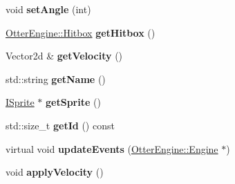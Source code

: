 \begin{DoxyCompactItemize}
\item 
void {\bfseries set\+Angle} (int)\hypertarget{class_otter_engine_1_1_object_aa3c4b0b2bcdf9462f841e9d3a58402be}{}\label{class_otter_engine_1_1_object_aa3c4b0b2bcdf9462f841e9d3a58402be}

\item 
\hyperlink{class_otter_engine_1_1_hitbox}{Otter\+Engine\+::\+Hitbox} {\bfseries get\+Hitbox} ()\hypertarget{class_otter_engine_1_1_object_acd5e30ca045b7c9972ecfd572572de64}{}\label{class_otter_engine_1_1_object_acd5e30ca045b7c9972ecfd572572de64}

\item 
Vector2d \& {\bfseries get\+Velocity} ()\hypertarget{class_otter_engine_1_1_object_a6f25a324e04e93fb0747d8c2f6e20097}{}\label{class_otter_engine_1_1_object_a6f25a324e04e93fb0747d8c2f6e20097}

\item 
std\+::string {\bfseries get\+Name} ()\hypertarget{class_otter_engine_1_1_object_a654aa1b2f6d84c9b1f9e123001be318e}{}\label{class_otter_engine_1_1_object_a654aa1b2f6d84c9b1f9e123001be318e}

\item 
\hyperlink{class_otter_engine_1_1_i_sprite}{I\+Sprite} $\ast$ {\bfseries get\+Sprite} ()\hypertarget{class_otter_engine_1_1_object_a8a87efe855c28b057e584abe912f59aa}{}\label{class_otter_engine_1_1_object_a8a87efe855c28b057e584abe912f59aa}

\item 
std\+::size\+\_\+t {\bfseries get\+Id} () const \hypertarget{class_otter_engine_1_1_object_a8156c4c18c7234fa7d2a6ee11b14f7d7}{}\label{class_otter_engine_1_1_object_a8156c4c18c7234fa7d2a6ee11b14f7d7}

\item 
virtual void {\bfseries update\+Events} (\hyperlink{class_otter_engine_1_1_engine}{Otter\+Engine\+::\+Engine} $\ast$)\hypertarget{class_otter_engine_1_1_object_a5b5b89450cfbabbdd4614602dc294afb}{}\label{class_otter_engine_1_1_object_a5b5b89450cfbabbdd4614602dc294afb}

\item 
void {\bfseries apply\+Velocity} ()\hypertarget{class_otter_engine_1_1_object_a0766f5931557e01ab0b800bcc0741224}{}\label{class_otter_engine_1_1_object_a0766f5931557e01ab0b800bcc0741224}

\end{DoxyCompactItemize}
